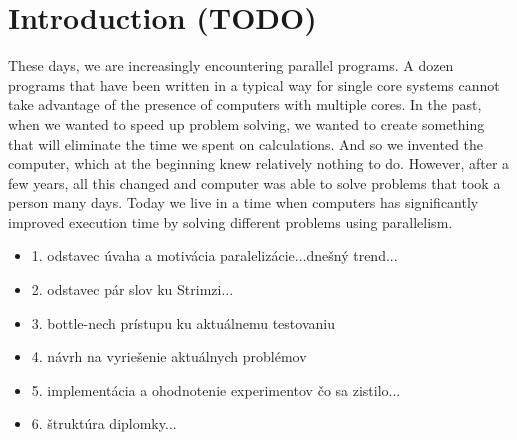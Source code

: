 \chapter{Introduction (TODO)}


These days, we are increasingly encountering parallel programs. A dozen programs that have been written in a typical way for single core systems cannot take advantage of the presence of computers with multiple cores. In the past, when we wanted to speed up problem solving, we wanted to create something that will eliminate the time we spent on calculations. And so we invented the computer, which at the beginning knew relatively nothing to do. However, after a few years, all this changed and computer was able to solve problems that took a person many days. Today we live in a time when computers has significantly improved execution time by solving different problems using parallelism. 


\begin{itemize}
    \item 1. odstavec úvaha a motivácia paralelizácie...dnešný trend...
    \item 2. odstavec pár slov ku Strimzi...
    \item 3. bottle-nech prístupu ku aktuálnemu testovaniu
    \item 4. návrh na vyriešenie aktuálnych problémov
    \item 5. implementácia a ohodnotenie experimentov čo sa zistilo...
    \item 6. štruktúra diplomky...
\end{itemize}